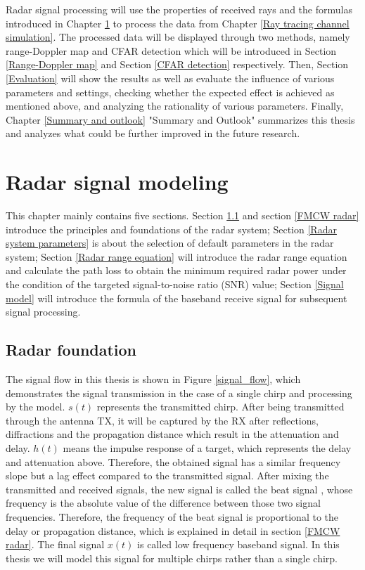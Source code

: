 \documentclass[12pt,DIV14,BCOR12mm,a4paper,footinclude=false,headinclude,parskip=half-,twoside,openright,cleardoublepage=empty,toc=index,bibliography=totoc,listof=totoc]{scrreprt}
\numberwithin{equation}{chapter}
\begin{document}
Radar signal processing will use the properties of received rays and the formulas introduced in Chapter \ref{Radar signal modeling} to process the data from Chapter \ref{Ray tracing channel simulation}. The processed data will be displayed through two methods, namely range-Doppler map and CFAR detection which will be introduced in Section \ref{Range-Doppler map} and Section \ref{CFAR detection} respectively. Then, Section \ref{Evaluation} will show the results as well as evaluate the influence of various parameters and settings, checking whether the expected effect is achieved as mentioned above, and analyzing the rationality of various parameters. Finally, Chapter \ref{Summary and outlook} "Summary and Outlook" summarizes this thesis and analyzes what could be further improved in the future research.


\chapter{Radar signal modeling} \label{Radar signal modeling}
This chapter mainly contains five sections. Section \ref{Radar foundation} and section \ref{FMCW radar} introduce the principles and foundations of the radar system; Section \ref{Radar system parameters} is about the selection of default parameters in the radar system; Section \ref{Radar range equation} will introduce the radar range equation and calculate the path loss to obtain the minimum required radar power under the condition of the targeted signal-to-noise ratio (SNR) value; Section \ref{Signal model} will introduce the formula of the baseband receive signal for subsequent signal processing.

\section{Radar foundation} \label{Radar foundation}
The signal flow in this thesis is shown in Figure \ref{signal_flow}, which demonstrates the signal transmission in the case of a single chirp and processing by the model. $s(t)$ represents the transmitted chirp. After being transmitted through the antenna TX, it will be captured by the RX after reflections, diffractions and the propagation distance which result in the attenuation and delay. $h(t)$ means the impulse response of a target, which represents the delay and attenuation above. Therefore, the obtained signal has a similar frequency slope but a lag effect compared to the transmitted signal. After mixing the transmitted and received signals, the new signal is called the beat signal \cite{beat_frequence_signal}, whose frequency is the absolute value of the difference between those two signal frequencies. Therefore, the frequency of the beat signal is proportional to the delay or propagation distance, which is explained in detail in section \ref{FMCW radar}. The final signal $x(t)$ is called low frequency baseband signal. In this thesis we will model this signal for multiple chirps rather than a single chirp.
\end{document}

